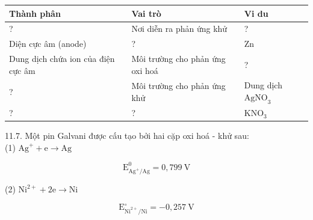 \documentclass[10pt]{article}
\begin{document}
\begin{center}
\begin{tabular}{|l|l|l|}
\hline
Thành phân & Vai trò & Vi du \\
\hline
? & Nơi diễn ra phản ứng khử & ? \\
\hline
Diện cực âm (anode) & ? & Zn \\
\hline
Dung dịch chứa ion của điện cực âm & Môi trường cho phản ứng oxi hoá & ? \\
\hline
? & Môi trường cho phản ứng khử & Dung dịch $\mathrm{AgNO}_{3}$ \\
\hline
? & ? & $\mathrm{KNO}_{3}$ \\
\hline
\end{tabular}
\end{center}

11.7. Một pin Galvani được cấu tạo bởi hai cặp oxi hoá - khử sau:\\
(1) $\mathrm{Ag}^{+}+\mathrm{e} \rightarrow \mathrm{Ag}$

$$
\mathrm{E}_{\mathrm{Ag}^{+} / \mathrm{Ag}}^{0}=0,799 \mathrm{~V}
$$

(2) $\mathrm{Ni}^{2+}+2 \mathrm{e} \rightarrow \mathrm{Ni}$

$$
\mathrm{E}_{\mathrm{Ni}^{2+} / \mathrm{Ni}}^{\circ}=-0,257 \mathrm{~V}
$$
\end{document}
